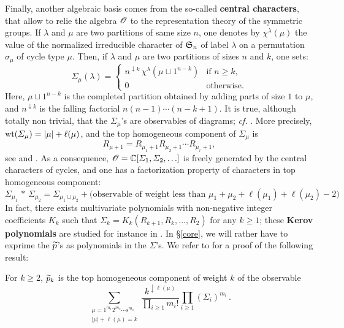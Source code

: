 \documentclass[10pt]{amsart}
\begin{document}
Finally, another algebraic basis comes from the so-called \textbf{central characters}, that allow to relie the algebra $\mathscr{O}$ to the representation theory of the symmetric groups. If $\lambda$ and $\mu$ are two partitions of same size $n$, one denotes by $\chi^{\lambda}(\mu)$ the value of the normalized irreducible character of $\mathfrak{S}_{n}$ of label $\lambda$ on a permutation $\sigma_{\mu}$ of cycle type $\mu$. Then, if $\lambda$ and $\mu$ are two partitions of sizes $n$ and $k$, one sets:
$$\varSigma_{\mu}(\lambda)=\begin{cases} n^{\downarrow k}\,\chi^{\lambda}(\mu\sqcup 1^{n-k})&\text{if }n\geq k,\\
0&\text{otherwise}.
\end{cases}$$
Here, $\mu\sqcup 1^{n-k}$ is the completed partition obtained by adding parts of size $1$ to $\mu$, and $n^{\downarrow k}$ is the falling factorial $n(n-1)\cdots(n-k+1)$. It is true, although totally non trivial, that the $\varSigma_{\mu}$'s are observables of diagrams; \emph{cf.} \cite[\S3-4]{IO02}. More precisely, $\mathrm{wt}(\varSigma_{\mu})=|\mu|+\ell(\mu)$, and the top homogeneous component of $\varSigma_{\mu}$ is 
$$R_{\mu+1}=R_{\mu_{1}+1}R_{\mu_{2}+1}\cdots R_{\mu_{r}+1},$$
see \cite{Bia98} and \cite[\S10]{IO02}. As a consequence, $\mathscr{O}=\mathbb{C}[\varSigma_{1},\varSigma_{2},\ldots]$ is freely generated by the central characters of cycles, and one has a factorization property of characters in top homogeneous component:
$$\varSigma_{\mu_{1}}\,*\,\varSigma_{\mu_{2}}=\varSigma_{\mu_{1}\sqcup \mu_{2}}+\big(\text{observable of weight less than }\mu_{1}+\mu_{2}+\ell(\mu_{1})+\ell(\mu_{2})-2\big)$$
In fact, there exists multivariate polynomials with non-negative integer coefficients $K_{k}$ such that $\varSigma_{k}=K_{k}(R_{k+1},R_{k},\ldots,R_{2})$ for any $k \geq 1$; these \textbf{Kerov polynomials} are studied for instance in \cite{DFS08}. In \S\ref{core}, we will rather have to exprime the $\widetilde{p}$'s as polynomials in the $\varSigma$'s. We refer to \cite[Proposition 3.7]{IO02} for a proof of the following result:
\begin{proposition}\label{changeofbasis}
For $k \geq 2$, $\widetilde{p}_{k}$ is the top homogeneous component of weight $k$ of the observable
$$\sum_{\substack{\mu=1^{m_{1}}2^{m_{2}}\cdots s^{m_{s}}\\|\mu|+\ell(\mu)=k }} \frac{k^{\downarrow \ell(\mu)}}{\prod_{i\geq 1} m_{i}!}\prod_{i\geq 1}(\varSigma_{i})^{m_{i}}\,.$$
\end{proposition}
\end{document}
